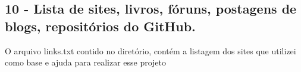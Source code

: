 \documentclass[11pt]{article}
\begin{document}
    \subsection{10 - Lista de sites, livros, fóruns, postagens de blogs,
repositórios do
GitHub.}\label{lista-de-sites-livros-fuxf3runs-postagens-de-blogs-reposituxf3rios-do-github.}

O arquivo links.txt contido no diretório, contém a listagem dos sites
que utilizei como base e ajuda para realizar esse projeto


    
    
    
    
\end{document}
